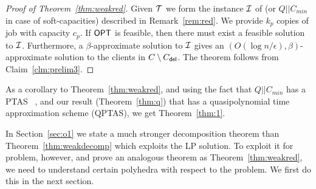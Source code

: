 \begin{proof}[Proof of Theorem~\ref{thm:weakred}]
	Given ${\cal T}$ we form the instance ${\cal I}$  of \cckp (or $Q||C_{min}$ in case of soft-capacities) described in Remark~\ref{rem:red}. We provide $k_p$ copies of job with capacity $c_p$. If $\mathsf{OPT}$ is feasible, then there must exist a feasible solution to ${\cal I}$. Furthermore, a $\beta$-approximate solution to ${\cal I}$ gives an $\left(O(\log n/\epsilon),\beta\right)$-approximate solution to the clients in $C\setminus C_{\mathsf{del}}$. The theorem follows from Claim~\ref{clm:prelim3}.
%	
\end{proof}

As a corollary to Theorem~\ref{thm:weakred}, and using the fact that $Q||C_{min}$ has a PTAS ~\cite{azar epstein approx 98},  and our result (Theorem~\ref{thm:q}) that \cckp has a  quasipolynomial time approximation scheme (QPTAS), we get Theorem~\ref{thm:1}.\medskip


In Section~\ref{sec:o1} we state a much stronger decomposition theorem than Theorem~\ref{thm:weakdecomp} which exploits the LP solution. 
To exploit it for \mckc problem, however, and prove an analogous theorem as Theorem~\ref{thm:weakred}, we need to understand certain polyhedra with respect to the \cckp problem.
We first do this in the next section.